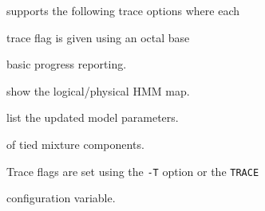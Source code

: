 \begin{optlist}
\stdoptB


\stdoptE


\stdoptF


\stdoptG


\stdoptH


\stdoptI


\stdoptJ


\stdoptK


\stdoptL


\stdoptM


\stdoptX





\end{optlist}












 supports the following trace options where each


trace flag is given using an octal base


\begin{optlist}


    basic progress reporting.


    show the logical/physical HMM map.


    list the updated model parameters.


           of tied mixture components.


\end{optlist}








Trace flags are set using the \texttt{-T} option or the  \texttt{TRACE} 


configuration variable.


















